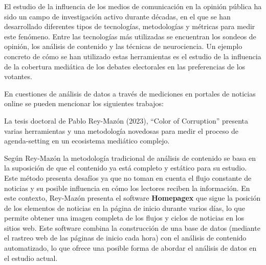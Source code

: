 \documentclass[12pt]{article}
\begin{document}
%


El estudio de la influencia de los medios de comunicación en la opinión pública ha sido un campo de investigación activo durante décadas, en el que se han desarrollado diferentes tipos de tecnologías, metodologías y métricas para medir este fenómeno. Entre las tecnologías más utilizadas se encuentran los sondeos de opinión, los análisis de contenido y las técnicas de neurociencia. Un ejemplo concreto de cómo se han utilizado estas herramientas es el estudio de la influencia de la cobertura mediática de los debates electorales en las preferencias de los votantes. 




En cuestiones de análisis de datos a través de mediciones en portales de noticias online se pueden mencionar los siguientes trabajos:

La tesis doctoral de Pablo Rey-Mazón (2023), ``Color of Corruption'' \cite{mazon:2023} presenta varias herramientas y una metodología novedosas para medir el proceso de agenda-setting en un ecosistema mediático complejo.

Según Rey-Mazón la metodología tradicional de análisis de contenido se basa en la suposición de que el contenido ya está completo y estático para su estudio. Este método presenta desafíos ya que no toman en cuenta el flujo constante de noticias y su posible influencia en cómo los lectores reciben la información. En este contexto, Rey-Mazón presenta el software \textbf{Homepagex} que sigue la posición de los elementos de noticias en la página de inicio durante varios días, lo que permite obtener una imagen completa de los flujos y ciclos de noticias en los sitios web. Este software combina la construcción de una base de datos (mediante el rastreo web de las páginas de inicio cada hora) con el análisis de contenido automatizado, lo que ofrece una posible forma de abordar el análisis de datos en el estudio actual.
\end{document}
